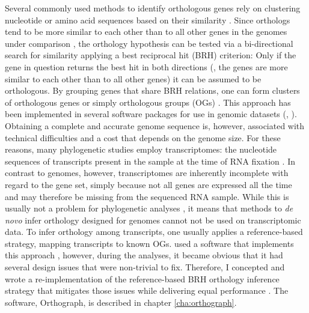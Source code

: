 Several commonly used methods to identify orthologous genes rely on
clustering nucleotide or amino acid sequences based on their similarity
\citep{Chen2007a}. Since orthologs tend to be more similar to each other
than to all other genes in the genomes under comparison
\citep{Altenhoff2012a}, the orthology hypothesis can be tested via a
bi-directional search for similarity applying a best reciprocal hit
(BRH) criterion: Only if the gene in question returns the best hit in
both directions (\ie, the genes are more similar to each other than to
all other genes) it can be assumed to be orthologous. By grouping genes
that share BRH relations, one can form clusters of orthologous genes or
simply orthologous groups (OGs) \citep{Altenhoff2012}. This approach
has been implemented in several software packages for use in genomic
datasets (\eg, \citet{Li2003, Tatusov2003, Berglund2008, Zdobnov2017}).
Obtaining a complete and accurate genome sequence is, however,
associated with technical difficulties and a cost that depends on the
genome size. For these reasons, many phylogenetic studies employ
transcriptomes: the nucleotide sequences of transcripts present in the
sample at the time of RNA fixation \citep{Wang2009}. In contrast to
genomes, however, transcriptomes are inherently incomplete with regard
to the gene set, simply because not all genes are expressed all the time
and may therefore be missing from the sequenced RNA sample. While this
is usually not a problem for phylogenetic analyses \citep{Wiens2006}, it
means that methods to \emph{de novo} infer orthology designed for
genomes cannot not be used on transcriptomic data. To infer orthology
among transcripts, one usually applies a reference-based strategy,
mapping transcripts to known OGs. \citet{Misof2014} used a software that
implements this approach \citep{Ebersberger2009}, however, during the
analyses, it became obvious that it had several design issues that were
non-trivial to fix. Therefore, I concepted and wrote a re-implementation
of the reference-based BRH orthology inference strategy that mitigates
those issues while delivering equal performance \citep{Petersen2017}.
The software, Orthograph, is described in chapter \ref{cha:orthograph}.

